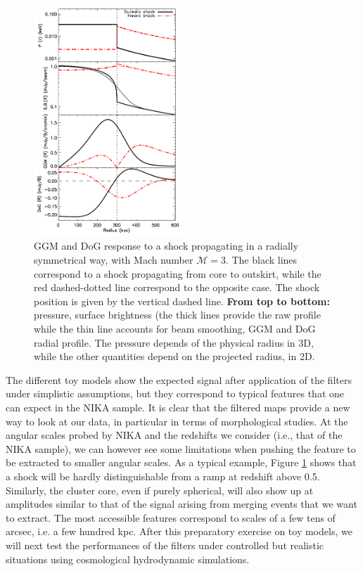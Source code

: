 \documentclass[twocolumn,traditabstract]{aa}
\begin{document}
\begin{figure}[h]
\centering
\includegraphics[trim=0cm 0cm 0cm 0cm, clip=true, width=0.5\textwidth]{Figure/Profiles_shock_15_15_45.pdf}
\caption{\footnotesize{GGM and DoG response to a shock propagating in a radially symmetrical way, with Mach number $\mathcal{M} = 3$. The black lines correspond to a shock propagating from core to outskirt, while the red dashed-dotted line correspond to the opposite case. The shock position is given by the vertical dashed line. {\bf From top to bottom:} pressure, surface brightness (the thick lines provide the raw profile while the thin line accounts for beam smoothing, GGM and DoG radial profile. The pressure depends of the physical radius in 3D, while the other quantities depend on the projected radius, in 2D.}}
\label{fig:test_filter_shock}
\end{figure}

The different toy models show the expected signal after application of the filters under simplistic assumptions, but they correspond to typical features that one can expect in the NIKA sample. It is clear that the filtered maps provide a new way to look at our data, in particular in terms of morphological studies. At the angular scales probed by NIKA and the redshifts we consider (i.e., that of the NIKA sample), we can however see some limitations when pushing the feature to be extracted to smaller angular scales. As a typical example, Figure \ref{fig:test_filter_shock} shows that a shock will be hardly distinguishable from a ramp at redshift above 0.5. Similarly, the cluster core, even if purely spherical, will also show up at amplitudes similar to that of the signal arising from merging events that we want to extract. The most accessible features correspond to scales of a few tens of arcsec, i.e. a few hundred kpc. After this preparatory exercise on toy models, we will next test the performances of the filters under controlled but realistic situations using cosmological hydrodynamic simulations.
\end{document}
